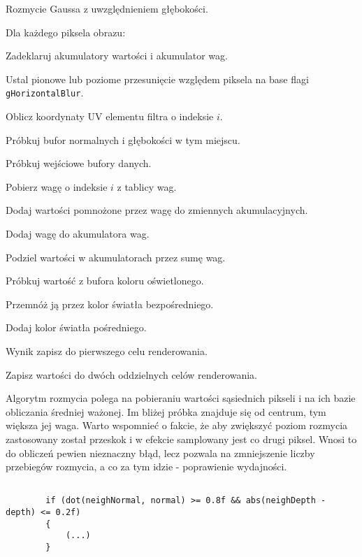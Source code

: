 		\begin{algorithm}[H]
			\label{alg_6_B}
			\caption{Rozmycie Gaussa z uwzględnieniem głębokości.}	
			Dla każdego piksela obrazu:
			
			\Indp
			
			Zadeklaruj akumulatory wartości i akumulator wag.
			
			Ustal pionowe lub poziome przesunięcie względem piksela na base flagi \texttt{gHorizontalBlur}.
			
			{
				Oblicz koordynaty UV elementu filtra o indeksie \(i\).
				
				Próbkuj bufor normalnych i głębokości w tym miejscu.
				
				{
					Próbkuj wejściowe bufory danych.
					
					Pobierz wagę o indeksie \(i\) z tablicy wag.
					
					Dodaj wartości pomnożone przez wagę do zmiennych akumulacyjnych.
					
					Dodaj wagę do akumulatora wag.
				}
			}
		
			Podziel wartości w akumulatorach przez sumę wag.
			
			{
				Próbkuj wartość z bufora koloru oświetlonego.
				
				Przemnóż ją przez kolor światła bezpośredniego.
				
				Dodaj kolor światła pośredniego.
				
				Wynik zapisz do pierwszego celu renderowania.
			}
			\Else
			{
				Zapisz wartości do dwóch oddzielnych celów renderowania.
			}
			
			\Indm
		\end{algorithm}
		\flushbottom\pagebreak
		Algorytm rozmycia polega na pobieraniu wartości sąsiednich pikseli i na ich bazie obliczania średniej ważonej. Im bliżej próbka znajduje się od centrum, tym większa jej waga. Warto wspomnieć o fakcie, że aby zwiększyć poziom rozmycia zastosowany został przeskok i w efekcie samplowany jest co drugi piksel. Wnosi to do obliczeń pewien nieznaczny błąd, lecz pozwala na zmniejszenie liczby przebiegów rozmycia, a co za tym idzie - poprawienie wydajności.
	
		\begin{lstlisting}[language=HLSL,caption={Warunek rozmycia Gaussa.},label={lst_6_G}]
		
		if (dot(neighNormal, normal) >= 0.8f && abs(neighDepth - depth) <= 0.2f)
		{
			(...)
		}
		
		\end{lstlisting}
		
